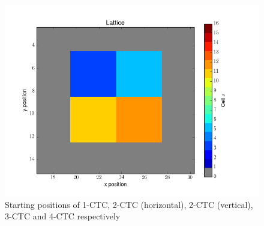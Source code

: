 \documentclass[12pt]{article}
\begin{document}
\begin{figure}[h]
	\includegraphics[scale=0.20]{img/4ctc-start}
	\caption{Starting positions of 1-CTC, 2-CTC (horizontal), 2-CTC (vertical), 3-CTC and 4-CTC respectively}
	\label{race_start}
\end{figure}
\end{document}
